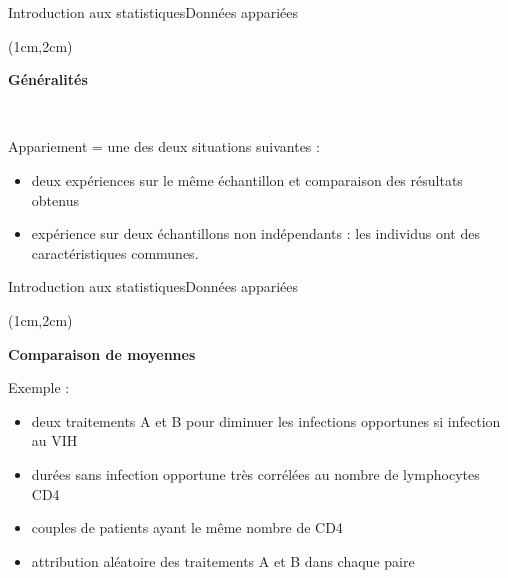 \documentclass{beamer}
\begin{document}
 

\begin{frame}{Introduction aux statistiques}{Données appariées}
\begin{textblock*}{\textwidth}(1cm,2cm)

\begin{center}{\bf \Large Généralités } \end{center}


\

Appariement  = une des deux situations suivantes :
\begin{itemize}
\item  deux expériences sur le même échantillon et comparaison des résultats obtenus
\item expérience sur deux échantillons  non indépendants : les individus  ont des caractéristiques communes.
\end{itemize}



\end{textblock*}

\end{frame}

 

\begin{frame}{Introduction aux statistiques}{Données appariées}
\begin{textblock*}{\textwidth}(1cm,2cm)

\begin{center}{\bf \Large Comparaison de moyennes } \end{center}


 Exemple :
 
 \begin{itemize}
 \item deux traitements A et B pour diminuer les  infections
opportunes  si infection au VIH
\item durées sans infection opportune  très corrélées
au nombre de lymphocytes CD4
\item couples de patients ayant le même nombre de CD4 
\item attribution aléatoire des traitements A et B dans chaque paire
 \end{itemize}




\end{textblock*}

\end{frame}
\end{document}
